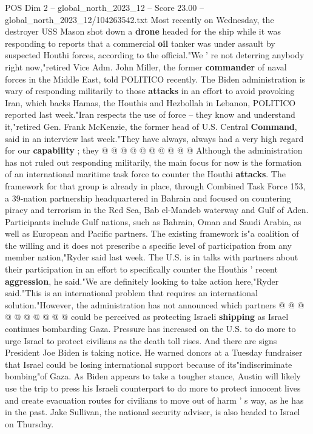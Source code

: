 \begin{textsample}{POS Dim 2 – global\_north\_2023\_12 – Score 23.00 – global\_north\_2023\_12/104263542.txt}
Most recently on Wednesday, the destroyer USS Mason shot down a \textbf{drone} headed for the ship while it was responding to reports that a commercial \textbf{oil} tanker was under assault by suspected Houthi forces, according to the official."We ' re not deterring anybody right now,"retired Vice Adm.
John Miller, the former \textbf{commander} of naval forces in the Middle East, told POLITICO recently.
The Biden administration is wary of responding militarily to those \textbf{attacks} in an effort to avoid provoking Iran, which backs Hamas, the Houthis and Hezbollah in Lebanon, POLITICO reported last week."Iran respects the use of force -- they know and understand it,"retired Gen.
Frank McKenzie, the former head of U.S.
Central \textbf{Command}, said in an interview last week."They have always, always had a very high regard for our \textbf{capability} ; they @ @ @ @ @ @ @ @ @ @ Although the administration has not ruled out responding militarily, the main focus for now is the formation of an international maritime task force to counter the Houthi \textbf{attacks}.
The framework for that group is already in place, through Combined Task Force 153, a 39-nation partnership headquartered in Bahrain and focused on countering piracy and terrorism in the Red Sea, Bab el-Mandeb waterway and Gulf of Aden.
Participants include Gulf nations, such as Bahrain, Oman and Saudi Arabia, as well as European and Pacific partners.
The existing framework is"a coalition of the willing and it does not prescribe a specific level of participation from any member nation,"Ryder said last week.
The U.S. is in talks with partners about their participation in an effort to specifically counter the Houthis ' recent \textbf{aggression}, he said."We are definitely looking to take action here,"Ryder said."This is an international problem that requires an international solution."However, the administration has not announced which partners @ @ @ @ @ @ @ @ @ @ could be perceived as protecting Israeli \textbf{shipping} as Israel continues bombarding Gaza.
Pressure has increased on the U.S. to do more to urge Israel to protect civilians as the death toll rises.
And there are signs President Joe Biden is taking notice.
He warned donors at a Tuesday fundraiser that Israel could be losing international support because of its"indiscriminate bombing"of Gaza.
As Biden appears to take a tougher stance, Austin will likely use the trip to press his Israeli counterpart to do more to protect innocent lives and create evacuation routes for civilians to move out of harm ' s way, as he has in the past.
Jake Sullivan, the national security adviser, is also headed to Israel on Thursday.

\end{textsample}

